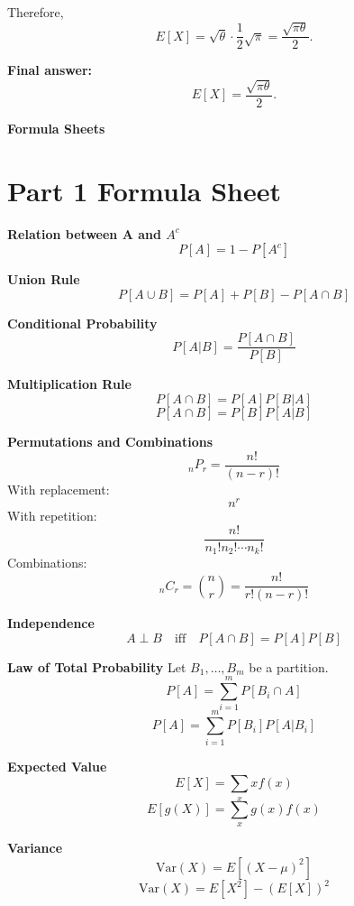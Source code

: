 \documentclass[11pt,letterpaper]{article}
\theoremstyle{remark}
\begin{document}
Therefore,
\[
E[X] = \sqrt{\theta} \cdot \frac{1}{2} \sqrt{\pi}
= \frac{\sqrt{\pi \theta}}{2}.
\]

\noindent\textbf{Final answer:}
\[
\boxed{
E[X] = \frac{\sqrt{\pi \theta}}{2}.
}
\]

\newpage

\thispagestyle{empty}
\vspace*{\fill}
\begin{center}
{\fontsize{60}{72}\selectfont \textbf{Formula Sheets}}
\end{center}
\vspace*{\fill}

\newpage


\section*{Part 1 Formula Sheet}

\textbf{Relation between A and $A^c$}
\[
P[A] = 1 - P[A^c] \tag{1}
\]

\textbf{Union Rule}
\[
P[A \cup B] = P[A] + P[B] - P[A \cap B] \tag{2}
\]

\textbf{Conditional Probability}
\[
P[A|B] = \frac{P[A \cap B]}{P[B]} \tag{3}
\]

\textbf{Multiplication Rule}
\[
P[A \cap B] = P[A]P[B|A] \tag{4a}
\]
\[
P[A \cap B] = P[B]P[A|B] \tag{4b}
\]

\textbf{Permutations and Combinations}
\[
{}_nP_r = \frac{n!}{(n-r)!} \tag{5a}
\]
With replacement:
\[
n^r \tag{5b}
\]
With repetition:
\[
\frac{n!}{n_1!n_2!\cdots n_k!} \tag{5c}
\]
Combinations:
\[
{}_nC_r = \binom{n}{r} = \frac{n!}{r!(n-r)!} \tag{5d}
\]

\textbf{Independence}
\[
A \perp B \quad \text{iff} \quad P[A \cap B] = P[A]P[B] \tag{6}
\]

\textbf{Law of Total Probability}
Let $B_1, \dots, B_m$ be a partition.
\[
P[A] = \sum_{i=1}^m P[B_i \cap A] \tag{7a}
\]
\[
P[A] = \sum_{i=1}^m P[B_i]P[A|B_i] \tag{7b}
\]

\textbf{Expected Value}
\[
E[X] = \sum_x x f(x) \tag{8a}
\]
\[
E[g(X)] = \sum_x g(x)f(x) \tag{8b}
\]

\textbf{Variance}
\[
\mathrm{Var}(X) = E[(X-\mu)^2] \tag{9b}
\]
\[
\mathrm{Var}(X) = E[X^2] - (E[X])^2 \tag{9c}
\]
\end{document}
